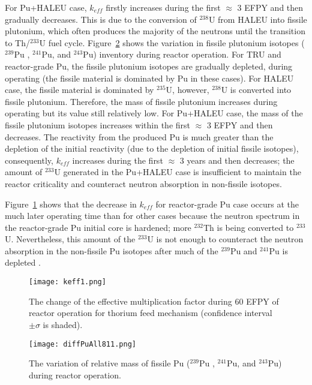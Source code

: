 For Pu+HALEU case, $k_{eff}$ firstly increases during the first $\approx$ $3$ EFPY and then gradually decreases. This is due to the conversion of $^{238}$U from HALEU into fissile plutonium, which often produces the majority of the neutrons until the transition to Th/$^{233}$U fuel cycle. Figure~\ref{fig:diffPuAll811} shows the variation in fissile plutonium isotopes ($^{239}$Pu , $^{241}$Pu, and $^{243}$Pu) inventory during reactor operation. For TRU and reactor-grade Pu, the fissile plutonium isotopes are gradually depleted, during operating (the fissile material is dominated by Pu in these cases). For HALEU case, the fissile material is dominated by $^{235}$U, however, $^{238}$U is converted into fissile plutonium. Therefore, the mass of fissile plutonium increases during operating but its value still relatively low. For Pu+HALEU case, the mass of the fissile plutonium isotopes increases within the first $\approx$ $3$ EFPY and then decreases. The reactivity from the produced Pu is much greater than the depletion of the initial reactivity (due to the depletion of initial fissile isotopes), consequently, $k_{eff}$ increases during the first $\approx$ $3$ years and then decreases; the amount of $^{233}$U generated in the Pu+HALEU case is insufficient to maintain the reactor criticality and counteract neutron absorption in non-fissile isotopes.

Figure~\ref{fig:keff1} shows that the decrease in $k_{eff}$ for reactor-grade Pu case occurs at the much later operating time than for other cases because the neutron spectrum in the reactor-grade Pu initial core is hardened; more $^{232}$Th is being converted to $^{233}$U. Nevertheless, this amount of the $^{233}$U is not enough to counteract the neutron absorption in the non-fissile Pu isotopes after much of the $^{239}$Pu and $^{241}$Pu is depleted \cite{betzler2016modeling}.



\begin{figure}
	\centering
	\texttt{[image: keff1.png]}
	\vspace{-0.5in}
	\caption{The change of the effective multiplication factor during 60 \gls{EFPY} of reactor operation for thorium feed mechanism (confidence interval $\pm\sigma$ is shaded).} 
	\label{fig:keff1}
\end{figure}

\begin{figure}
	\centering
	\texttt{[image: diffPuAll811.png]}
	\vspace{-0.5in}
	\caption{The variation of relative mass of fissile Pu ($^{239}$Pu , $^{241}$Pu, and $^{243}$Pu) during reactor operation.} 
	\label{fig:diffPuAll811}
\end{figure}

